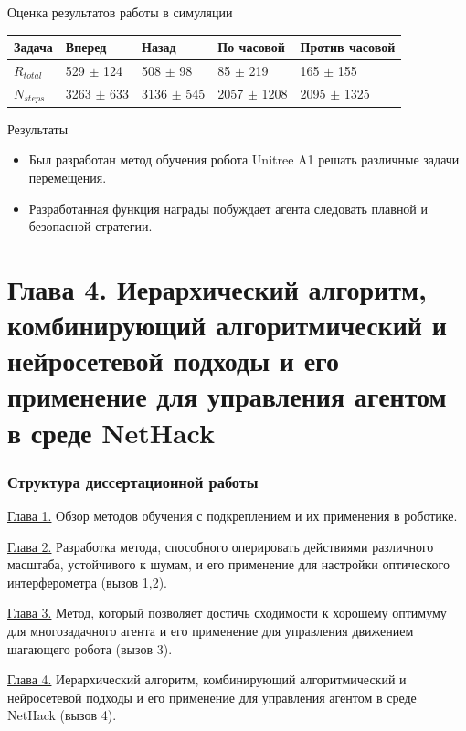 \begin{frame}{Оценка результатов работы в симуляции}
\begin{table} [htbp]
\begin{threeparttable}
\begin{tabular}{| p{1cm} || p{2cm} | p{2cm} | p{2cm} |p{2cm} |}
            \hline
            \hline
            Задача & Вперед & Назад & По часовой & Против часовой \\
            \hline
            $R_{total}$ &	529 $\pm$ 124 &	508 $\pm$ 98 &	85 $\pm$ 219 &	165 $\pm$ 155 \\
            $N_{steps}$ & 3263 $\pm$ 633 &	3136 $\pm$ 545 &	2057 $\pm$ 1208 &	2095 $\pm$ 1325 \\
            \hline
            \hline
        \end{tabular}
    \end{threeparttable}
\end{table}
\end{frame}

\begin{frame}{Результаты}
\begin{itemize}
    \item[\textcolor{ForestGreen}{\checkmark}] Был разработан метод обучения робота Unitree A1 решать различные задачи перемещения.
    \item[\textcolor{ForestGreen}{\checkmark}] Разработанная функция награды побуждает агента следовать плавной и безопасной стратегии.
\end{itemize}
\end{frame}



\section{Глава 4. Иерархический алгоритм, комбинирующий алгоритмический и
нейросетевой подходы и его применение для управления агентом в среде NetHack}


\begin{frame}
    \frametitle{Структура диссертационной работы}
    \begin{itemize}
        \item \underline{Глава 1.} Обзор методов обучения с подкреплением и их применения в роботике. 
        \item \underline{Глава 2.} Разработка метода, способного оперировать действиями различного масштаба, устойчивого к шумам, и его применение для настройки оптического интерферометра (вызов 1,2).
        \item \underline{Глава 3.} Метод, который позволяет достичь сходимости к хорошему оптимуму для многозадачного агента и его применение  для управления движением шагающего робота (вызов 3).
        {\color{orange}\item \underline{Глава 4.} Иерархический алгоритм, комбинирующий алгоритмический и нейросетевой подходы и его применение для управления агентом в среде NetHack (вызов 4).}
    \end{itemize}
\end{frame}

